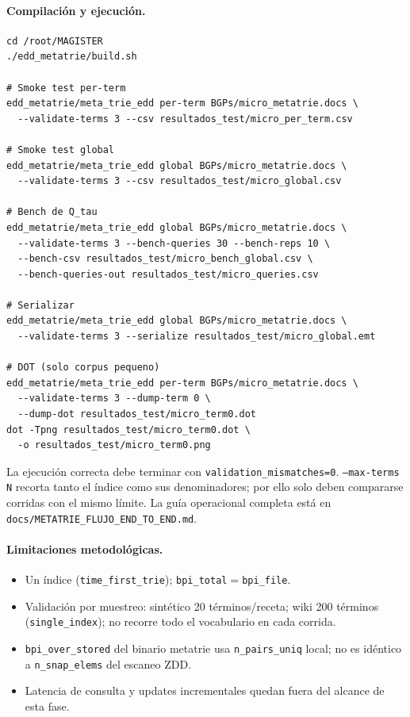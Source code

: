 \paragraph{Compilación y ejecución.}
\begin{verbatim}
cd /root/MAGISTER
./edd_metatrie/build.sh

# Smoke test per-term
edd_metatrie/meta_trie_edd per-term BGPs/micro_metatrie.docs \
  --validate-terms 3 --csv resultados_test/micro_per_term.csv

# Smoke test global
edd_metatrie/meta_trie_edd global BGPs/micro_metatrie.docs \
  --validate-terms 3 --csv resultados_test/micro_global.csv

# Bench de Q_tau
edd_metatrie/meta_trie_edd global BGPs/micro_metatrie.docs \
  --validate-terms 3 --bench-queries 30 --bench-reps 10 \
  --bench-csv resultados_test/micro_bench_global.csv \
  --bench-queries-out resultados_test/micro_queries.csv

# Serializar
edd_metatrie/meta_trie_edd global BGPs/micro_metatrie.docs \
  --validate-terms 3 --serialize resultados_test/micro_global.emt

# DOT (solo corpus pequeno)
edd_metatrie/meta_trie_edd per-term BGPs/micro_metatrie.docs \
  --validate-terms 3 --dump-term 0 \
  --dump-dot resultados_test/micro_term0.dot
dot -Tpng resultados_test/micro_term0.dot \
  -o resultados_test/micro_term0.png
\end{verbatim}
La ejecución correcta debe terminar con
\texttt{validation\_mismatches=0}. \texttt{--max-terms N} recorta tanto el
índice como sus denominadores; por ello solo deben compararse corridas con el
mismo límite. La guía operacional completa está en
\texttt{docs/METATRIE\_FLUJO\_END\_TO\_END.md}.

\paragraph{Limitaciones metodológicas.}
\begin{itemize}
\item Un índice (\texttt{time\_first\_trie}); \texttt{bpi\_total}$=$\texttt{bpi\_file}.
\item Validación por muestreo: sintético 20 términos/receta; wiki 200 términos
      (\texttt{single\_index}); no recorre todo el vocabulario en cada corrida.
\item \texttt{bpi\_over\_stored} del binario metatrie usa \texttt{n\_pairs\_uniq} local;
      no es idéntico a \texttt{n\_snap\_elems} del escaneo ZDD.
\item Latencia de consulta y updates incrementales quedan fuera del alcance de esta fase.
\end{itemize}
